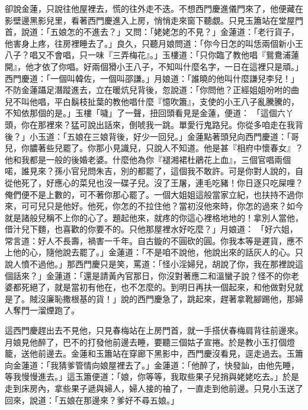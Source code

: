 卻說金蓮，只說往他屋裡去，慌的往外走不迭。不想西門慶進儀門來了，他便藏在影壁邊黑影兒里，看著西門慶進入上房，悄悄走來窗下聽覷。只見玉簫站在堂屋門首，說道：「五娘怎的不進去？」又問：「姥姥怎的不見？」金蓮道：「老行貨子，他害身上疼，往房裡睡去了。」良久，只聽月娘問道：「你今日怎的叫恁兩個新小王八子？唱又不會唱，只一味『三弄梅花』。」玉樓道：「只你臨了教他唱『鴛鴦浦蓮開』，他才依了你唱。好兩個猾小王八子，不知叫什麼名字，一日在這裡只是頑。」西門慶道：「一個叫韓佐，一個叫邵謙。」月娘道：「誰曉的他叫什麼謙兒李兒！」不防金蓮躡足潛蹤進去，立在暖炕兒背後，忽說道：「你問他？正經姐姐吩咐的曲兒不叫他唱，平白鬍枝扯葉的教他唱什麼『憶吹簫』，支使的小王八子亂騰騰的，不知依那個的是。」玉樓「噦」了一聲，扭回頭看見是金蓮，便道： 「這個六丫頭，你在那裡來？猛可說出話來，倒唬我一跳。單愛行鬼路兒。你從多咱走在我背後？」小玉道：「五娘在三娘背後，好少一回兒。」金蓮點著頭兒向西門慶道：「哥兒，你膿著些兒罷了。你那小見識兒，只說人不知道。他是甚『相府中懷春女』？他和我都是一般的後婚老婆。什麼他為你『褪湘裙杜鵑花上血』，三個官唱兩個喏，誰見來？孫小官兒問朱吉，別的都罷了，這個我不敢許。可是你對人說的，自從他死了，好應心的菜兒也沒一碟子兒。沒了王屠，連毛吃豬！你日逐只吃屎哩？俺們便不是上數的，可不著你那心罷了。一個大姐姐這般當家立紀，也扶持不過你來，可可兒只是他好。他死，你怎的不拉住他？當初沒他來時，你怎的過來？如今就是諸般兒稱不上你的心了。題起他來，就疼的你這心裡格地地的！拿別人當他，借汁兒下麵，也喜歡的你要不的。只他那屋裡水好吃麼？」月娘道： 「好六姐，常言道：好人不長壽，禍害一千年。自古鏇的不圓砍的圓。你我本等是遲貨，應不上他的心，隨他說去罷了。」金蓮道：「不是咱不說他，他說出來的話灰人的心。只說人憤不過他。」那西門慶只是笑，罵道：「怪小淫婦兒，胡說了你，我在那裡說這個話來？」金蓮道：「還是請黃內官那日，你沒對著應二和溫蠻子說？怪不的你老婆都死絕了，就是當初有他在，也不怎麼的。到明日再扶一個起來，和他做對兒就是了。賊沒廉恥撒根基的貨！」說的西門慶急了，跳起來，趕著拿靴腳踢他，那婦人奪門一溜煙跑了。

這西門慶趕出去不見他，只見春梅站在上房門首，就一手搭伏春梅肩背往前邊來。月娘見他醉了，巴不的打發他前邊去睡，要聽三個姑子宣捲。於是教小玉打個燈籠，送他前邊去。金蓮和玉簫站在穿廊下黑影中，西門慶沒看見，逕走過去。玉簫向金蓮道：「我猜爹管情向娘屋裡去了。」金蓮道：「他醉了，快發訕，由他先睡，等我慢慢進去。」這玉簫便道：「娘，你等等，我取些果子兒捎與姥姥吃去。」於是走到床房內，拿些果子遞與婦人，婦人接的袖了，一直走到他前邊。只見小玉送了回來，說道：「五娘在那邊來？爹好不尋五娘。」

